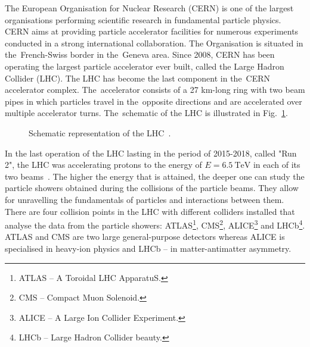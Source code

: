 
The European Organisation for Nuclear Research (CERN) is one of the largest organisations performing scientific research in fundamental particle physics. CERN aims at providing particle accelerator facilities for numerous experiments conducted in a strong international collaboration. The Organisation is situated in the~French-Swiss border in the~Geneva area. Since 2008, CERN has been operating the largest particle accelerator ever built, called the Large Hadron Collider (LHC). The LHC has become the last component in the~CERN accelerator complex. The~accelerator consists of a 27 km-long ring with two beam pipes in which particles travel in the~opposite directions and are accelerated over multiple accelerator turns. The~schematic of the LHC is illustrated in Fig.~\ref{fig:schematic_representation_lhc}.

\begin{figure}[H]
    \centering
    \caption{Schematic representation of the LHC~\cite{schematic_representation_lhc}.}
    \label{fig:schematic_representation_lhc}
\end{figure}

In the last operation of the LHC lasting in the period of 2015-2018, called "Run 2", the LHC was accelerating protons to the energy of $E=6.5~\text{TeV}$ in each of its two beams~\cite{cern_main_webpage}. The higher the energy that is attained, the deeper one can study the particle showers obtained during the collisions of the particle beams. They allow for unravelling the fundamentals of particles and interactions between them. There are four collision points in the LHC with different colliders installed that analyse the data from the particle showers: ATLAS\footnote{ATLAS -- A Toroidal LHC ApparatuS.}, CMS\footnote{CMS -- Compact Muon Solenoid.}, ALICE\footnote{ALICE -- A Large Ion Collider Experiment.} and LHCb\footnote{LHCb -- Large Hadron Collider beauty.}. ATLAS and CMS are two large general-purpose detectors whereas ALICE is specialised in heavy-ion physics and LHCb -- in matter-antimatter asymmetry.~\cite[p.~3-21]{evans_marvel_of_technology}

